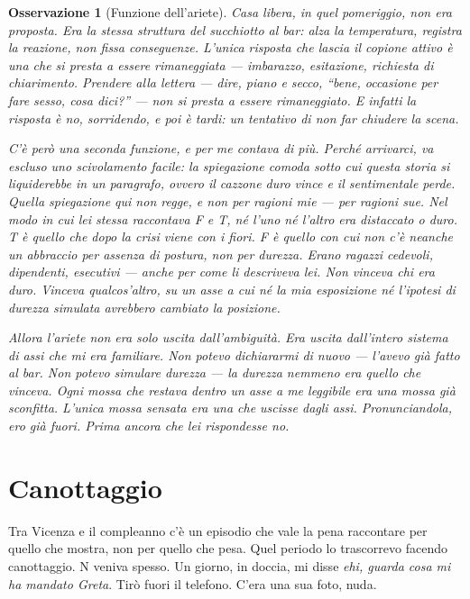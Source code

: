 \documentclass[
    oneside,                 %
    openany,                 %
    titlepage,
    11pt,
    a4paper,
    italian,
    DIV=14,                  %
    headinclude,
    footinclude=true,
    cleardoublepage=empty
]{scrbook}
\theoremstyle{ctplain}
\theoremstyle{ctdef}
\theoremstyle{ctrem}
\newtheorem*{oss}{Osservazione}
\begin{document}
\begin{oss}[Funzione dell'ariete]
\emph{Casa libera}, in quel pomeriggio, non era proposta. Era la stessa struttura del succhiotto al bar: alza la temperatura, registra la reazione, non fissa conseguenze. L'unica risposta che lascia il copione attivo è una che si presta a essere rimaneggiata --- imbarazzo, esitazione, richiesta di chiarimento. Prendere alla lettera --- dire, piano e secco, \emph{``bene, occasione per fare sesso, cosa dici?''} --- non si presta a essere rimaneggiato. E infatti la risposta è no, sorridendo, e poi \emph{è tardi}: un tentativo di non far chiudere la scena.

C'è però una seconda funzione, e per me contava di più. Perché arrivarci, va escluso uno scivolamento facile: la spiegazione comoda sotto cui questa storia si liquiderebbe in un paragrafo, ovvero \emph{il cazzone duro vince e il sentimentale perde}. Quella spiegazione qui non regge, e non per ragioni mie --- per ragioni sue. Nel modo in cui lei stessa raccontava F e T, né l'uno né l'altro era distaccato o duro. T è quello che dopo la crisi viene con i fiori. F è quello con cui non c'è neanche un abbraccio per assenza di postura, non per durezza. Erano ragazzi cedevoli, dipendenti, esecutivi --- anche per come li descriveva lei. Non vinceva chi era duro. Vinceva qualcos'altro, su un asse a cui né la mia esposizione né l'ipotesi di durezza simulata avrebbero cambiato la posizione.

Allora l'ariete non era solo uscita dall'ambiguità. Era uscita dall'intero sistema di assi che mi era familiare. Non potevo dichiararmi di nuovo --- l'avevo già fatto al bar. Non potevo simulare durezza --- la durezza nemmeno era quello che vinceva. Ogni mossa che restava dentro un asse a me leggibile era una mossa già sconfitta. L'unica mossa sensata era una che uscisse dagli assi. Pronunciandola, ero già fuori. Prima ancora che lei rispondesse no.
\end{oss}

\chapter{Canottaggio}

Tra Vicenza e il compleanno c'è un episodio che vale la pena raccontare per quello che mostra, non per quello che pesa. Quel periodo lo trascorrevo facendo canottaggio. N veniva spesso. Un giorno, in doccia, mi disse \emph{ehi, guarda cosa mi ha mandato Greta}. Tirò fuori il telefono. C'era una sua foto, nuda.
\end{document}
